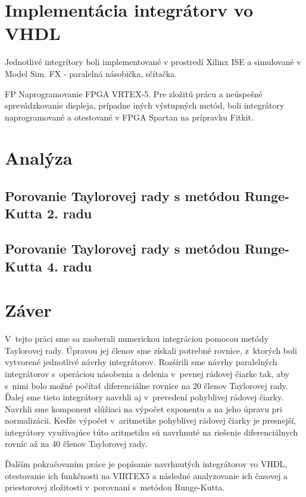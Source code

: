 \chapter{Implementácia integrátorv vo VHDL}
Jednotlivé integrítory boli implementované v prostredí Xilinx ISE a simulované v Model Sim. 
FX - paralelná násobička, sčítačka.


FP
Naprogramovanie FPGA VRTEX-5. Pre zložitú prácu a neúspešné sprevádzkovanie displeja, prípadne iných výstupných metód, boli integrátory naprogramované a otestované v FPGA Spartan na prípravku Fitkit.


\chapter{Analýza}
\section{Porovanie Taylorovej rady s metódou Runge-Kutta 2. radu}
\section{Porovanie Taylorovej rady s metódou Runge-Kutta 4. radu}

\chapter{Záver}
V~tejto práci sme sa zaoberali numerickou integráciou pomocou metódy Taylorovej rady. Úpravou jej členov sme získali potrebné rovnice, z~ktorých boli vytvorené jednotlivé návrhy integrátorov.
Rozšírili sme návrhy paralelných integrátorov s~operáciou násobenia a delenia v~pevnej rádovej čiarke tak, aby s~nimi bolo možné počítať diferenciálne rovnice na 20 členov Taylorovej rady. Ďalej sme tieto integrátory navrhli aj v~prevedení pohyblivej rádovej čiarky. Navrhli sme komponent slúžiaci na výpočet exponentu a na jeho úpravu pri normalizácii. Keďže výpočet v~aritmetike pohyblivej rádovej čiarky je presnejší, integrátory využívajúce túto aritmetiku sú navrhnuté na riešenie diferenciálnych rovníc až na 40 členov Taylorovej rady.

Ďalším pokračovaním práce je popísanie navrhnutých integrátorov vo VHDL, otestovanie ich funkčnosti na VIRTEX5 a následné analyzovanie ich časovej a priestorovej zložitosti v~porovnaní s~metódou Runge-Kutta.


